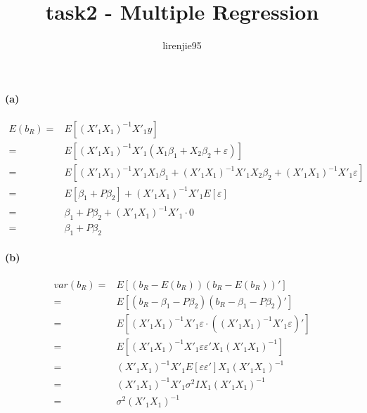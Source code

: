 \documentclass{article}
\title{task2 - Multiple Regression}
\author{lirenjie95}
\date{}
\begin{document}
 
\maketitle
\paragraph{(a)}
\[\begin{aligned}
E(b_{R}) = &E\left[\left(X'_{1}X_{1}\right)^{-1}X'_{1}y\right]\\
         = &E\left[\left(X'_{1}X_{1}\right)^{-1}X'_{1}\left(X_{1}\beta_{1} + X_{2}\beta_{2} + \varepsilon\right)\right]\\
         = &E\left[\left(X'_{1}X_{1}\right)^{-1}X'_{1}X_{1}\beta_{1} + \left(X'_{1}X_{1}\right)^{-1}X'_{1}X_{2}\beta_{2} + \left(X'_{1}X_{1}\right)^{-1}X'_{1}\varepsilon\right]\\
         = &E\left[\beta_{1} + P\beta_{2} \right]+ \left(X'_{1}X_{1}\right)^{-1}X'_{1}E\left[\varepsilon\right]\\
         = &\beta_{1} + P\beta_{2} + \left(X'_{1}X_{1}\right)^{-1}X'_{1}\cdot0\\
         = &\beta_{1} + P\beta_{2}
\end{aligned}
\]

\paragraph{(b)}
\[\begin{aligned}
var(b_{R}) = &E\left[\left(b_{R} - E\left(b_{R}\right)\right)\left(b_{R} - E\left(b_{R}\right)\right)'\right]\\
           = &E\left[\left(b_{R} - \beta_{1} - P\beta_{2}\right)\left(b_{R} - \beta_{1} - P\beta_{2}\right)'\right]\\
           = &E\left[\left(X'_{1}X_{1}\right)^{-1}X'_{1}\varepsilon \cdot \left(\left(X'_{1}X_{1}\right)^{-1}X'_{1}\varepsilon\right)'\right]\\
           = &E\left[\left(X'_{1}X_{1}\right)^{-1}X'_{1}\varepsilon\varepsilon'X_{1}\left(X'_{1}X_{1}\right)^{-1}\right]\\
           = &\left(X'_{1}X_{1}\right)^{-1}X'_{1}E\left[\varepsilon\varepsilon'\right]X_{1}\left(X'_{1}X_{1}\right)^{-1}\\
           = &\left(X'_{1}X_{1}\right)^{-1}X'_{1}\sigma^{2}IX_{1}\left(X'_{1}X_{1}\right)^{-1}\\
           = &\sigma^{2}\left(X'_{1}X_{1}\right)^{-1}
\end{aligned}
\]
\end{document}
